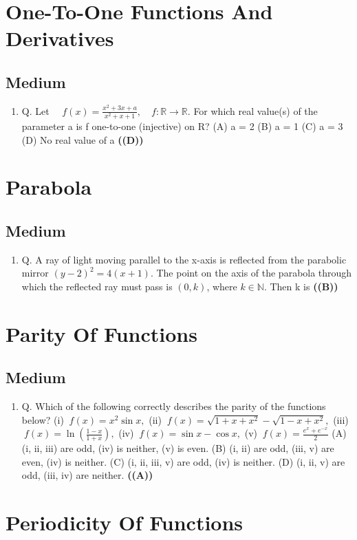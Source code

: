 \documentclass{article}
\begin{document}
\section{One-To-One Functions And Derivatives}
\subsection{Medium}
\begin{enumerate}
\item Q. Let
$\quad f(x) = \frac{x^2 + 3x + a}{x^2+x+1},\quad f: \mathbb{R}\to\mathbb{R}.$ For which real value(s) of the parameter a is f one-to-one (injective) on R?
(A) a = 2
(B) a = 1
(C) a = 3
(D) No real value of a \hfill \textbf{((D))}
\end{enumerate}
\section{Parabola}
\subsection{Medium}
\begin{enumerate}
\item Q. A ray of light moving parallel to the x-axis is reflected from the parabolic mirror $(y - 2)^2 = 4(x + 1)$. The point on the axis of the parabola through which the reflected ray must pass is $(0,k)$, where $k \in \mathbb{N}$. Then k is \hfill \textbf{((B))}
\end{enumerate}
\section{Parity Of Functions}
\subsection{Medium}
\begin{enumerate}
\item Q. Which of the following correctly describes the parity of the functions below?
(i) $\ f(x) = x^2 \sin x,$
(ii) $\ f(x) = \sqrt{1 + x + x^2} - \sqrt{1 - x + x^2},$
(iii) $\ f(x) = \ln(\frac{1-x}{1+x}),$
(iv) $\ f(x) = \sin x - \cos x,$
(v) $\ f(x) = \frac{e^x + e^{-x}}{2}$
(A) (i, ii, iii) are odd, (iv) is neither, (v) is even.
(B) (i, ii) are odd, (iii, v) are even, (iv) is neither.
(C) (i, ii, iii, v) are odd, (iv) is neither.
(D) (i, ii, v) are odd, (iii, iv) are neither. \hfill \textbf{((A))}
\end{enumerate}
\section{Periodicity Of Functions}
\end{document}
